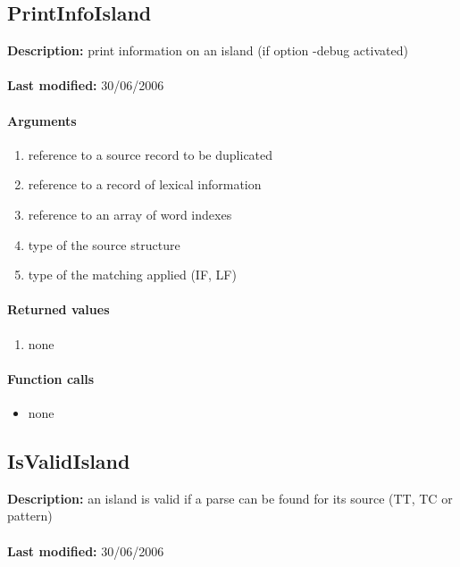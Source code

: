 \subsection{PrintInfoIsland}
\textbf{Description:} print information on an island (if option -debug activated)\\
\\\textbf{Last modified:} 30/06/2006

\paragraph{Arguments}
\begin{enumerate}
\item reference to a source record to be duplicated
\item reference to a record of lexical information
\item reference to an array of word indexes
\item type of the source structure
\item type of the matching applied (IF, LF)
\end{enumerate}

\paragraph{Returned values}
\begin{enumerate}
\item none
\end{enumerate}

\paragraph{Function calls}
\begin{itemize}
\item none
\end{itemize}

\subsection{IsValidIsland}
\textbf{Description:} an island is valid if a parse can be found for its source (TT, TC or pattern)\\
\\\textbf{Last modified:} 30/06/2006

